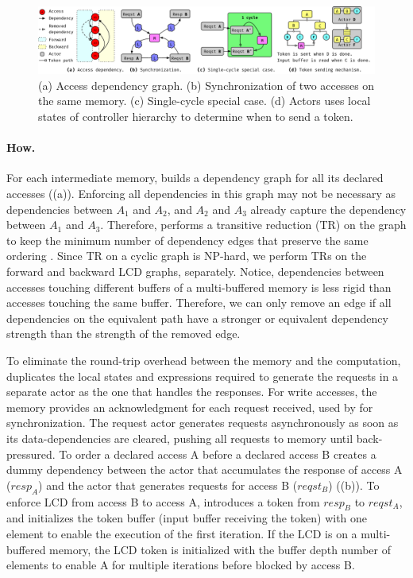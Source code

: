 \begin{figure}
\centering
\includegraphics[width=1.0\textwidth]{figures/synch_mech.pdf}
\caption{
    (a) Access dependency graph.
    (b) Synchronization of two accesses on the same memory.
    (c) Single-cycle special case.
    (d) Actors uses local states of controller hierarchy to determine when to send a token.
}\label{fig:depgraph}\label{fig:token}\label{fig:tokentrick}\label{fig:tokenwhen}
\end{figure}

\paragraph{How.} For each intermediate memory, \name{} builds a dependency graph for all its declared accesses ((a)).
Enforcing all dependencies in this graph may not be necessary as dependencies between $A_1$ and $A_2$, and $A_2$ and $A_3$ already capture the dependency between $A_1$ and $A_3$.
Therefore, \name{} performs a transitive reduction (TR) on the graph to keep the minimum number of dependency edges that preserve the same ordering \cite{tr}.
Since TR on a cyclic graph is NP-hard, we perform TRs on the forward and backward LCD graphs, separately.
Notice, dependencies between accesses touching different buffers of a multi-buffered memory is less rigid than accesses touching the same buffer.
Therefore, we can only remove an edge if all dependencies on the equivalent path have a stronger or equivalent dependency strength than the strength of the removed edge.

To eliminate the round-trip overhead between the memory and the computation, 
\name{} duplicates the local states and expressions required to generate the requests in a separate actor as the one that handles the responses.
For write accesses, the memory provides an acknowledgment for each request received, used by \name for synchronization.
The request actor generates requests asynchronously as soon as its data-dependencies are cleared, pushing all requests to memory until back-pressured.
To order a declared access A before a declared access B
\name creates a dummy dependency between the actor that accumulates the response of access A ($resp_A$) and the actor that generates requests for access B ($reqst_B$) ((b)).
To enforce LCD from access B to access A, \name introduces a token from $resp_B$ to $reqst_A$, and initializes the token buffer (input buffer receiving the token) with one element to enable the execution of the first iteration.
If the LCD is on a multi-buffered memory, the LCD token is initialized with the buffer depth number of elements to enable A for multiple iterations before blocked by access B.


